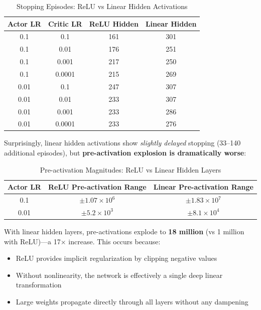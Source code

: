 \begin{table}[htbp]
\caption{Stopping Episodes: ReLU vs Linear Hidden Activations}
\label{tab:linear_activation}
\centering
\small
\begin{tabular}{cccc}
\toprule
\textbf{Actor LR} & \textbf{Critic LR} & \textbf{ReLU Hidden} & \textbf{Linear Hidden} \\
\midrule
0.1 & 0.1 & 161 & 301 \\
0.1 & 0.01 & 176 & 251 \\
0.1 & 0.001 & 217 & 250 \\
0.1 & 0.0001 & 215 & 269 \\
0.01 & 0.1 & 247 & 307 \\
0.01 & 0.01 & 233 & 307 \\
0.01 & 0.001 & 233 & 286 \\
0.01 & 0.0001 & 233 & 276 \\
\bottomrule
\end{tabular}
\end{table}

Surprisingly, linear hidden activations show \textit{slightly delayed} stopping (33--140 additional episodes), but \textbf{pre-activation explosion is dramatically worse}:

\begin{table}[htbp]
\caption{Pre-activation Magnitudes: ReLU vs Linear Hidden Layers}
\label{tab:linear_preact}
\centering
\small
\begin{tabular}{ccc}
\toprule
\textbf{Actor LR} & \textbf{ReLU Pre-activation Range} & \textbf{Linear Pre-activation Range} \\
\midrule
0.1 & $\pm 1.07 \times 10^{6}$ & $\pm 1.83 \times 10^{7}$ \\
0.01 & $\pm 5.2 \times 10^{3}$ & $\pm 8.1 \times 10^{4}$ \\
\bottomrule
\end{tabular}
\end{table}

With linear hidden layers, pre-activations explode to \textbf{18 million} (vs 1 million with ReLU)---a 17$\times$ increase. This occurs because:
\begin{itemize}
    \item ReLU provides implicit regularization by clipping negative values
    \item Without nonlinearity, the network is effectively a single deep linear transformation
    \item Large weights propagate directly through all layers without any dampening
\end{itemize}

